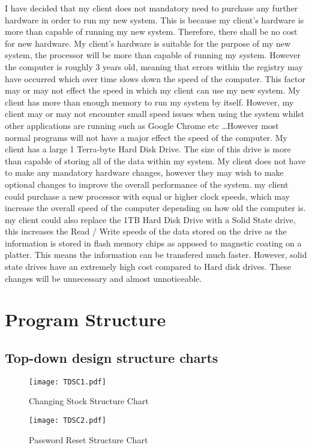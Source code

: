 I have decided that my client does not mandatory need to purchase any further hardware in order to run my new system. This is because my client's hardware is more than capable of running my new system. Therefore, there shall be no cost for new hardware. My client's hardware is suitable for the purpose of my new system, the processor will be more than capable of running my system. However the computer is roughly 3 years old, meaning that errors within the registry may have occurred which over time slows down the speed of the computer. This factor may or may not effect the speed in which my client can use my new system. My client has more than enough memory to run my system by itself. However, my client may or may not encounter small speed issues when using the system whilst other applications are running such as Google Chrome etc \ldots However most normal programs will not have a major effect the speed of the computer.  My client has a large 1 Terra-byte Hard Disk Drive. The size of this drive is more than capable of storing all of the data within my system. My client does not have to make any mandatory hardware changes, however they may wish to make optional changes to improve the overall performance of the system. my client could purchase a new processor with equal or higher clock speeds, which may increase the overall speed of the computer depending on how old the computer is.  my client could also replace the 1TB Hard Disk Drive with a Solid State drive, this increases the Read / Write speeds of the data stored on the drive as the information is stored in flash memory chips as apposed to magnetic coating on a platter. This means the information can be transfered much faster. However, solid state drives have an extremely high cost compared to Hard disk drives. These changes will be unnecessary and almost unnoticeable.

\section{Program Structure}


\subsection{Top-down design structure charts}

\begin{landscape}
\begin{figure}[H]
\caption{Changing Stock Structure Chart} \label{fig:SotckStructureChart}
\hfill\texttt{[image: TDSC1.pdf]}\hspace*{\fill}
\end{figure}



\begin{figure}[H]
\caption{Password Reset Structure Chart} \label{fig:PasswordStructureChart}
\hfill\texttt{[image: TDSC2.pdf]}\hspace*{\fill}
\end{figure}
\end{landscape}


